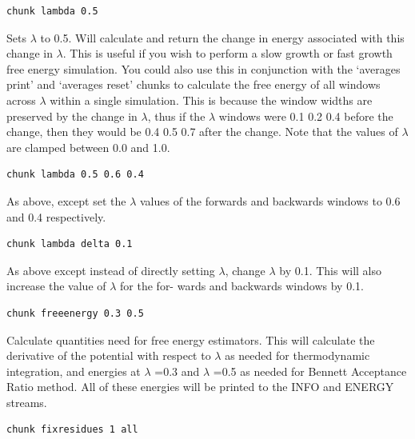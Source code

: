 \documentclass[letterpaper,10pt,english]{sphinxmanual}
\begin{document}
\begin{Verbatim}[commandchars=\\\{\}]
chunk lambda 0.5
\end{Verbatim}

Sets \(\lambda\) to 0.5. Will calculate and return the change in energy associated with this change in \(\lambda\). This is useful if you wish to perform a slow growth or fast growth free energy simulation. You could also use this in conjunction with the ‘averages print’ and ‘averages reset’ chunks to calculate the free energy of all windows across \(\lambda\) within a single simulation. This is because the window widths are preserved by the change in \(\lambda\), thus if the \(\lambda\) windows were 0.1 0.2 0.4 before the change, then they would be 0.4 0.5 0.7 after the change. Note that the values of \(\lambda\) are clamped between 0.0 and 1.0.

\begin{Verbatim}[commandchars=\\\{\}]
chunk lambda 0.5 0.6 0.4
\end{Verbatim}

As above, except set the \(\lambda\) values of the forwards and backwards windows to 0.6 and 0.4 respectively.

\begin{Verbatim}[commandchars=\\\{\}]
chunk lambda delta 0.1
\end{Verbatim}

As above except instead of directly setting \(\lambda\), change \(\lambda\) by 0.1. This will also increase the value of \(\lambda\) for the for- wards and backwards windows by 0.1.

\begin{Verbatim}[commandchars=\\\{\}]
chunk freeenergy 0.3 0.5
\end{Verbatim}

Calculate quantities need for free energy estimators. This will calculate the derivative of the potential with respect to \(\lambda\) as needed for thermodynamic integration, and energies at \(\lambda\) =0.3 and \(\lambda\) =0.5 as needed for Bennett Acceptance Ratio method. All of these energies will be printed to the INFO and ENERGY streams.

\begin{Verbatim}[commandchars=\\\{\}]
chunk fixresidues 1 all
\end{Verbatim}
\end{document}
